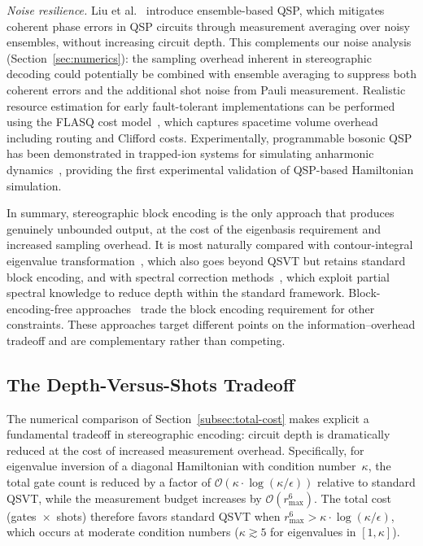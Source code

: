 \emph{Noise resilience.}
Liu et al.~\cite{LiuDongAnNiu2026} introduce ensemble-based
QSP, which mitigates coherent phase errors in QSP circuits
through measurement averaging over noisy ensembles, without
increasing circuit depth.  This complements our noise analysis
(Section~\ref{sec:numerics}): the sampling overhead inherent
in stereographic decoding could potentially be combined with
ensemble averaging to suppress both coherent errors and
the additional shot noise from Pauli measurement.  Realistic
resource estimation for early fault-tolerant implementations
can be performed using the FLASQ cost
model~\cite{HugginsEtAl2025}, which captures spacetime
volume overhead including routing and Clifford costs.
Experimentally, programmable bosonic QSP has been demonstrated
in trapped-ion systems for simulating anharmonic
dynamics~\cite{McGarryEtAl2026}, providing the first
experimental validation of QSP-based Hamiltonian simulation.

In summary, stereographic block encoding is the only approach
that produces genuinely unbounded output, at the cost of the
eigenbasis requirement and increased sampling overhead.
It is most naturally compared with contour-integral eigenvalue
transformation~\cite{JiangAn2026}, which also goes beyond
QSVT but retains standard block encoding, and with spectral
correction methods~\cite{Suresh2026}, which exploit partial
spectral knowledge to reduce depth within the standard
framework.  Block-encoding-free
approaches~\cite{MahasingheEtAl2025,
	Jo2026,WangZhangHazraEtAl2025} trade the block encoding
requirement for other constraints.  These approaches target
different points on the information--overhead tradeoff and
are complementary rather than competing.

\subsection{The Depth-Versus-Shots Tradeoff}
\label{subsec:tradeoff}

The numerical comparison of Section~\ref{subsec:total-cost}
makes explicit a fundamental tradeoff in stereographic
encoding: circuit depth is dramatically reduced at the cost
of increased measurement overhead.  Specifically, for
eigenvalue inversion of a diagonal Hamiltonian with condition
number~$\kappa$, the total gate count is reduced by a factor
of $\mathcal{O}(\kappa \cdot \log(\kappa/\epsilon))$ relative
to standard QSVT, while the measurement budget increases by
$\mathcal{O}(r_{\max}^6)$.  The total cost
(gates~$\times$~shots) therefore favors standard QSVT when
$r_{\max}^6 > \kappa \cdot \log(\kappa/\epsilon)$, which
occurs at moderate condition numbers ($\kappa \gtrsim 5$
for eigenvalues in $[1,\kappa]$).

